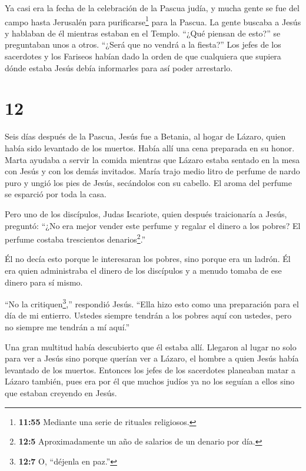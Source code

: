  Ya casi era la fecha de la celebración de la Pascua judía,
y mucha gente se fue del campo hasta Jerusalén para
purificarse\footnote{\textbf{11:55} Mediante una serie de rituales
  religiosos.} para la Pascua.  La gente buscaba a Jesús y
hablaban de él mientras estaban en el Templo. ``¿Qué piensan de esto?''
se preguntaban unos a otros. ``¿Será que no vendrá a la fiesta?''
 Los jefes de los sacerdotes y los Fariseos habían dado la
orden de que cualquiera que supiera dónde estaba Jesús debía informarles
para así poder arrestarlo.

\hypertarget{section-11}{%
\section{12}\label{section-11}}

 Seis días después de la Pascua, Jesús fue a Betania, al
hogar de Lázaro, quien había sido levantado de los muertos. 
Había allí una cena preparada en su honor. Marta ayudaba a servir la
comida mientras que Lázaro estaba sentado en la mesa con Jesús y con los
demás invitados.  María trajo medio litro de perfume de
nardo puro y ungió los pies de Jesús, secándolos con su cabello. El
aroma del perfume se esparció por toda la casa.

 Pero uno de los discípulos, Judas Iscariote, quien después
traicionaría a Jesús, preguntó:  ``¿No era mejor vender este
perfume y regalar el dinero a los pobres? El perfume costaba trescientos
denarios\footnote{\textbf{12:5} Aproximadamente un año de salarios de un
  denario por día.}.''

 Él no decía esto porque le interesaran los pobres, sino
porque era un ladrón. Él era quien administraba el dinero de los
discípulos y a menudo tomaba de ese dinero para sí mismo.

 ``No la critiquen\footnote{\textbf{12:7} O, ``déjenla en
  paz.''},'' respondió Jesús. ``Ella hizo esto como una preparación para
el día de mi entierro.  Ustedes siempre tendrán a los pobres
aquí con ustedes, pero no siempre me tendrán a mí aquí.''

 Una gran multitud había descubierto que él estaba allí.
Llegaron al lugar no solo para ver a Jesús sino porque querían ver a
Lázaro, el hombre a quien Jesús había levantado de los muertos.
 Entonces los jefes de los sacerdotes planeaban matar a
Lázaro también,  pues era por él que muchos judíos ya no
los seguían a ellos sino que estaban creyendo en Jesús.

